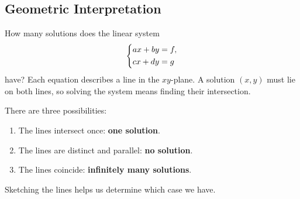 \documentclass[10pt,letterpaper]{article}
\begin{document}

\subsection{Geometric Interpretation}

How many solutions does the linear system
\[
\begin{dcases}
ax+by=f,\\
cx+dy=g
\end{dcases}
\]
have? Each equation describes a line in the $xy$-plane.
A solution $(x,y)$ must lie on both lines, so solving
the system means finding their intersection.

There are three possibilities:
\begin{enumerate}
    \item The lines intersect once: \textbf{one solution}.
    \item The lines are distinct and parallel:
    \textbf{no solution}.
    \item The lines coincide:
    \textbf{infinitely many solutions}.
\end{enumerate}
Sketching the lines helps us determine which case we have.
\end{document}
